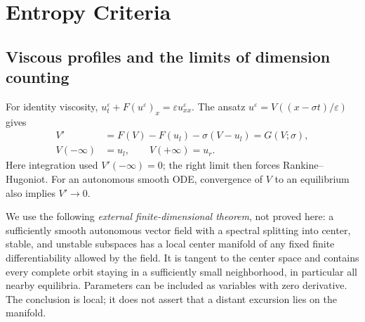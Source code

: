 \section{Entropy Criteria}
\label{sec:11-4}
\subsection{Viscous profiles and the limits of dimension counting}
For identity viscosity,
$u_t^\varepsilon+F(u^\varepsilon)_x=\varepsilon u_{xx}^\varepsilon$.
The ansatz $u^\varepsilon=V((x-\sigma t)/\varepsilon)$ gives
\begin{equation}\label{eq:11-profile}
 \begin{split}
 V'&=F(V)-F(u_l)-\sigma(V-u_l)=G(V;\sigma),\\
 V(-\infty)&=u_l,\qquad V(+\infty)=u_r.
 \end{split}
\end{equation}
Here integration used $V'(-\infty)=0$; the right limit then forces
Rankine--Hugoniot. For an autonomous smooth ODE, convergence of $V$
to an equilibrium also implies $V'\to0$.

We use the following \emph{external finite-dimensional theorem}, not
proved here: a sufficiently smooth autonomous vector field with a
spectral splitting into center, stable, and unstable subspaces has a
local center manifold of any fixed finite differentiability allowed
by the field. It is tangent to the center space and contains every
complete orbit staying in a sufficiently small neighborhood, in
particular all nearby equilibria. Parameters can be included as
variables with zero derivative. The conclusion is local; it does not
assert that a distant excursion lies on the manifold.

